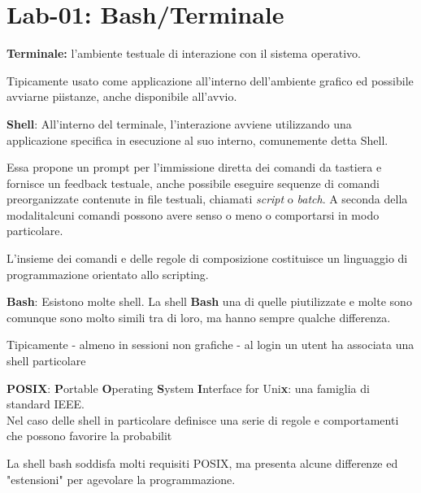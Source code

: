 \section{Lab-01: Bash/Terminale}
\begin{flushleft}
  \textbf{Terminale:} \ace l'ambiente testuale di interazione con il sistema operativo. \par Tipicamente usato come
  applicazione all'interno dell'ambiente grafico ed \ace possibile avviarne pi\acu istanze, \ace anche disponibile all'avvio. 
\end{flushleft}
\begin{flushleft}
  \textbf{Shell}: All'interno del terminale, l'interazione avviene utilizzando una applicazione specifica in esecuzione 
  al suo interno, comunemente detta Shell. \par 
  Essa propone un prompt per l'immissione diretta dei comandi da tastiera e fornisce un feedback testuale, \ace anche possibile 
  eseguire sequenze di comandi preorganizzate contenute in file testuali, chiamati \textit{script} o \textit{batch}.
  A seconda della modalit\aca alcuni comandi possono avere senso o meno o comportarsi in modo particolare.\par \par
  L'insieme dei comandi e delle regole di composizione costituisce un linguaggio di programmazione orientato allo scripting. 
\end{flushleft}
\begin{flushleft}
  \textbf{Bash}: Esistono molte shell. La shell \textbf{Bash} \ace una di quelle pi\acu utilizzate e molte sono comunque sono molto simili 
  tra di loro, ma hanno sempre qualche differenza. \par
  Tipicamente - almeno in sessioni non grafiche - al login un utent ha associata una shell particolare
\end{flushleft}
\begin{flushleft}
  \textbf{POSIX}: \textbf{P}ortable \textbf{O}perating \textbf{S}ystem \textbf{I}nterface for Uni\textbf{x}: \ace una famiglia  di standard IEEE.\\
  Nel caso delle shell in particolare definisce una serie di regole e comportamenti  che possono favorire la probabilit\aca \par 
  La shell bash soddisfa molti requisiti POSIX, ma presenta alcune differenze ed "estensioni" per agevolare la programmazione. 
\end{flushleft}
